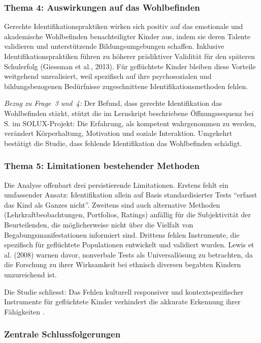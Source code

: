 \documentclass[ngerman, a4paper]{article}
\begin{document}
\subsubsection*{Thema 4: Auswirkungen auf das Wohlbefinden}

Gerechte Identifikationspraktiken wirken sich positiv auf das emotionale
und akademische Wohlbefinden benachteiligter Kinder aus, indem sie deren
Talente validieren und unterstützende Bildungsumgebungen schaffen. Inklusive
Identifikationspraktiken führen zu höherer prädiktiver Validität für den
späteren Schulerfolg (Giessman et al., 2013). Für geflüchtete Kinder
bleiben diese Vorteile weitgehend unrealisiert, weil spezifisch auf ihre
psychosozialen und bildungsbezogenen Bedürfnisse zugeschnittene
Identifikationsmethoden fehlen.

\textit{Bezug zu Frage~3 und~4:} Der Befund, dass gerechte Identifikation
das Wohlbefinden stärkt, stützt die im Lernskript beschriebene
Öffnungssequenz bei S. im SOLUX-Projekt: Die Erfahrung, als kompetent
wahrgenommen zu werden, verändert Körperhaltung, Motivation und soziale
Interaktion. Umgekehrt bestätigt die Studie, dass fehlende Identifikation
das Wohlbefinden schädigt.

\subsubsection*{Thema 5: Limitationen bestehender Methoden}

Die Analyse offenbart drei persistierende Limitationen. Erstens fehlt ein
umfassender Ansatz: Identifikation allein auf Basis standardisierter Tests
\enquote{erfasst das Kind als Ganzes nicht}. Zweitens sind auch alternative
Methoden (Lehrkraftbeobachtungen, Portfolios, Ratings) anfällig für die
Subjektivität der Beurteilenden, die möglicherweise nicht über die
Vielfalt von Begabungsmanifestationen informiert sind. Drittens fehlen
Instrumente, die spezifisch für geflüchtete Populationen entwickelt und
validiert wurden. Lewis et al. (2008) warnen davor, nonverbale Tests als
Universallösung zu betrachten, da die Forschung zu ihrer Wirksamkeit bei
ethnisch diversen begabten Kindern unzureichend ist.

Die Studie schliesst: Das Fehlen kulturell responsiver und
kontextspezifischer Instrumente für geflüchtete Kinder verhindert die
akkurate Erkennung ihrer Fähigkeiten \parencite{alodat2025equitable}.

\subsubsection*{Zentrale Schlussfolgerungen}
\end{document}
